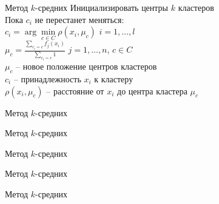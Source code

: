 \documentclass[10pt]{beamer}
\begin{document}
\begin{frame}{Метод $k$-средних}
	Инициализировать центры $k$ кластеров \\
	\vspace{2mm}
	Пока $c_i$ не перестанет меняться:\\
	\hspace{5mm} $c_i = \arg\min\limits_{c \in C} \rho(x_i, \mu_c)$ \hspace{5mm} $i = 1,\dots, l$\\
	\vspace{2mm}\hspace{5mm} ${\mu_c = \frac{\sum\limits_{c_i = c} f_j(x_i)}{\sum\limits_{c_i = c} 1} }$ \hspace{10mm} $j = 1,\dots, n$, $c \in C$\\
	\vspace{2mm}
	$\mu_c$ -- новое положение центров кластеров\\
	$c_i$ -- принадлежность $x_i$ к кластеру\\
	$\rho(x_i, \mu_c)$ -- расстояние от $x_i$ до центра кластера $\mu_c$
\end{frame}

\begin{frame}{Метод $k$-средних}
\end{frame}

\begin{frame}{Метод $k$-средних}
\end{frame}

\begin{frame}{Метод $k$-средних}
\end{frame}

\begin{frame}{Метод $k$-средних}
\end{frame}

\begin{frame}{Метод $k$-средних}
\end{frame}
\end{document}
